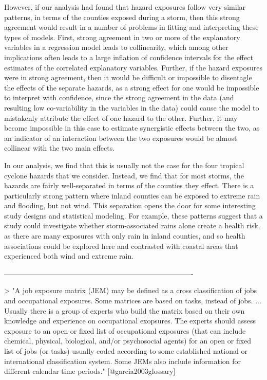 However, if our analysis had found that hazard exposures follow very similar
patterns, in terms of the counties exposed during a storm, then this strong
agreement would result in a number of problems in fitting and interpreting these
types of models. First, strong agreement in two or more of the explanatory
variables in a regression model leads to collinearity, which among other
implications often leads to a large inflation of confidence intervals for the
effect estimates of the correlated explanatory variables. Further, if the hazard
exposures were in strong agreement, then it would be difficult or impossible to
disentagle the effects of the separate hazards, as a strong effect for one would
be impossible to interpret with confidence, since the strong agreement in the
data (and resulting low co-variability in the variables in the data) could cause
the model to mistakenly attribute the effect of one hazard to the other.
Further, it may become impossible in this case to estimate synergistic effects
between the two, as an indicator of an interaction between the two exposures
would be almost collinear with the two main effects.

In our analysis, we find that this is usually not the case for the four tropical
cyclone hazards that we consider. Instead, we find that for most storms, the
hazards are fairly well-separated in terms of the counties they effect. There is
a particularly strong pattern where inland counties can be exposed to extreme
rain and flooding, but not wind. This separation opens the door for some
interesting study designs and statistical modeling. For example, these patterns
suggest that a study could investigate whether storm-associated rains alone
create a health risk, as there are many exposures with only rain in inland
counties, and so health associations could be explored here and contrasted with
coastal areas that experienced both wind and extreme rain.

-------------------------------------------------------------------------------

> "A job exposure matrix (JEM) may be defined as a cross classification of jobs
and occupational exposures. Some matrices are based on tasks, instead of jobs. 
... Usually there is a group of experts who build the matrix based on their 
own knowledge and experience on occupational exopsures. The experts should 
assess exposure to an open or fixed list of occupational exposures (that can 
include chemical, physical, biological, and/or psychosocial agents) for an
open or fixed list of jobs (or tasks) usually coded according to some established
national or international classification system. Some JEMs also include 
information for different calendar time periods." [@garcia2003glossary]

